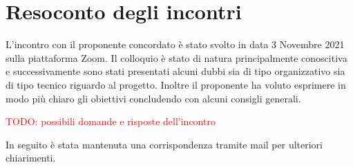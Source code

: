 \section{Resoconto degli incontri}
L’incontro con il proponente concordato è stato svolto in data 3 Novembre 2021 sulla piattaforma Zoom. Il colloquio è stato di natura principalmente conoscitiva e successivamente sono stati presentati alcuni dubbi sia di tipo organizzativo sia di tipo tecnico riguardo al progetto. Inoltre il proponente ha voluto esprimere in modo più chiaro gli obiettivi concludendo con alcuni consigli generali.

\textcolor{red}{TODO: possibili domande e risposte dell'incontro}

In seguito è stata mantenuta una corrispondenza tramite mail per ulteriori chiarimenti.
